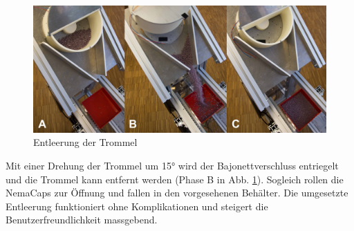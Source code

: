 \begin{figure}[H]
	\includegraphics[draft=false,width=1\textwidth]{Illustrationen/7-Inbetriebnahme_und_Kalibration/entleeren.jpg}
	\caption{Entleerung der Trommel}
	\label{fig:entleeren}
\end{figure}

Mit einer Drehung der Trommel um 15° wird der Bajonettverschluss entriegelt und die Trommel kann entfernt werden (Phase B in Abb. \ref{fig:entleeren}). Sogleich rollen die NemaCaps zur Öffnung und fallen in den vorgesehenen Behälter. Die umgesetzte Entleerung funktioniert ohne Komplikationen und steigert die Benutzerfreundlichkeit massgebend.